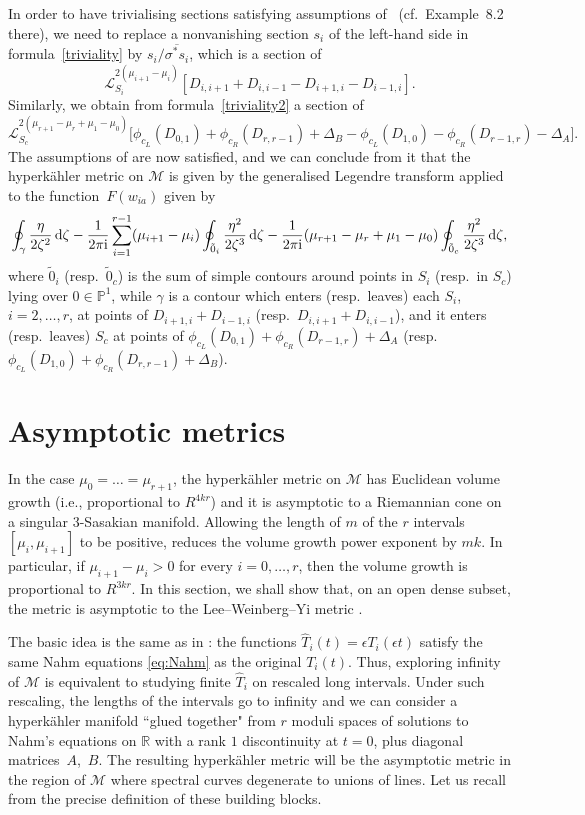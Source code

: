 \documentclass[10pt,a4paper]{amsart}
\newcommand{\ol}{\overline}
\numberwithin{equation}{section}
\newcommand{\oP}{{\mathbb{P}}}
\newcommand{\oR}{{\mathbb{R}}}
\newcommand{\sM}{{\mathcal{M}}} %
\begin{document}
{ In order to have trivialising sections satisfying {assumptions} of~\cite[Theorem~7.5]{BielGZ} (cf.\ Example~8.2 there), we need to replace a nonvanishing section $s_i$ of the left-hand side in formula~\eqref{triviality} by $s_i/\ol{\sigma^\ast s_i}$, which is a section of
\[
\mathscr{L}_{S_i}^{2(\mu_{i+1}-\mu_{i})}[D_{i,i+1}+D_{i,i-1}-D_{i+1,i}-D_{i-1,i}].
\]
 Similarly, we obtain from formula~\eqref{triviality2} a section of
\[
\mathscr{L}_{S_c}^{2(\mu_{r+1}-\mu_r+\mu_1-\mu_0)}\bigl[\phi_{c_L} (D_{0,1} ) +\phi_{c_R} (D_{r,r-1} )+\Delta_B -\phi_{c_L} (D_{1,0} ) -\phi_{c_R} (D_{r-1,r} )-\Delta_A\bigr].
\]
 The assumptions of \cite[Theorem~7.5]{BielGZ} are now satisfied, and we can conclude from it that the hyperk\"ahler metric on $\sM$ is given by the generalised Legendre transform applied to {the function~$F(w_{ia})$ given by}
\[
\oint_\gamma \frac{\eta}{2\zeta^2}\,{\rm d}\zeta
-\frac{1}{2\pi {\rm i}}\sum_{i=1}^{r-1}(\mu_{i+1}-\mu_{i})\oint_{\tilde 0_i}\frac{\eta^2}{2\zeta^3}\,{\rm d}\zeta-\frac{1}{2\pi {\rm i}}(\mu_{r+1}-\mu_r+\mu_1-\mu_0)\oint_{\tilde 0_c}\frac{\eta^2}{2\zeta^3}\,{\rm d}\zeta,
\]
 where $\tilde 0_i$ (resp.~$\tilde 0_c$) is the sum of simple contours around points in $S_i$ (resp.~in $S_c$) lying over ${0\in\oP^1}$, while $\gamma$ is a contour which enters (resp.~leaves) each $S_i$, $i=2,\dots,r$, at points of $D_{i+1,i}+D_{i-1,i}$
 (resp.~$D_{i,i+1}+D_{i,i-1}$), and it enters (resp.~leaves) $S_c$ at points of $\phi_{c_L}(D_{0,1}) +\phi_{c_R}(D_{r-1,r})+\Delta_A$ (resp.~$\phi_{c_L}(D_{1,0})+\phi_{c_R}(D_{r,r-1})+\Delta_B$).


 \section{Asymptotic metrics}\label{Sec:Asymp}
 In the case $\mu_0=\dots=\mu_{r+1}$, the hyperk\"ahler metric on $\sM$ has Euclidean volume growth (i.e., proportional to $ R^{4kr}$) and it is asymptotic to a Riemannian cone on a singular $3$-Sasakian manifold. Allowing the length of $m$ of the $r$ intervals $[\mu_i,\mu_{i+1}]$ to be positive, reduces the volume growth {power exponent by} $mk$. In particular, if $\mu_{i+1}-\mu_i>0$ for every $i=0,\dots,r$, then the volume growth is
 proportional to $R^{3kr}$. In this section, we shall show that, on an open dense subset, the metric is asymptotic to the Lee--Weinberg--Yi metric \cite{LWY}.

 The basic idea is the same as in \cite{BSU}: the functions $\hat{T}_i(t)=\epsilon T_i(\epsilon t)$ satisfy the same Nahm equations \eqref{eq:Nahm} as the original $T_i(t)$. Thus, exploring infinity of $\sM$ is equivalent to studying finite $\hat{T}_i$ on rescaled long intervals.
Under such rescaling, the lengths of the intervals go to infinity and we can consider a hyperk\"ahler manifold ``glued together" from $r$ moduli spaces of solutions to Nahm's equations on $\oR$ with a rank $1$ {discontinuity} at $t=0$, plus diagonal matrices~$A$,~$B$. The resulting hyperk\"ahler metric will be the asymptotic metric in the region of $\sM$ where spectral curves degenerate to unions of lines. Let us recall from \cite{BSU} the precise definition of these building blocks.

}
\end{document}
